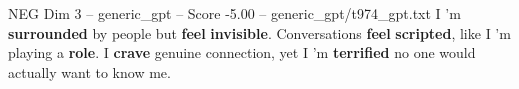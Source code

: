 \begin{textsample}{NEG Dim 3 – generic\_gpt – Score -5.00 – generic\_gpt/t974\_gpt.txt}  \label{ex:f3_neg_017}
I ’m \textbf{surrounded} by people but \textbf{feel} \textbf{invisible}.
Conversations \textbf{feel} \textbf{scripted}, like I ’m playing a \textbf{role}.
I \textbf{crave} genuine connection, yet I ’m \textbf{terrified} no one would actually want to know me.

\end{textsample}
